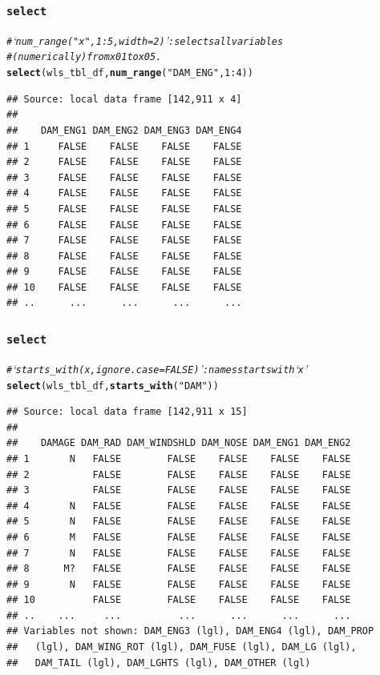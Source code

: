 \documentclass{beamer}\usepackage[]{graphicx}\usepackage[]{color}
\makeatletter
\newcommand{\hlnum}[1]{\textcolor[rgb]{0.686,0.059,0.569}{#1}}%
\newcommand{\hlstr}[1]{\textcolor[rgb]{0.192,0.494,0.8}{#1}}%
\newcommand{\hlcom}[1]{\textcolor[rgb]{0.678,0.584,0.686}{\textit{#1}}}%
\newcommand{\hlopt}[1]{\textcolor[rgb]{0,0,0}{#1}}%
\newcommand{\hlstd}[1]{\textcolor[rgb]{0.345,0.345,0.345}{#1}}%
\newcommand{\hlkwd}[1]{\textcolor[rgb]{0.737,0.353,0.396}{\textbf{#1}}}%
\newenvironment{kframe}{%
 \def\at@end@of@kframe{}%
 \ifinner\ifhmode%
  \def\at@end@of@kframe{\end{minipage}}%
  \begin{minipage}{\columnwidth}%
 \fi\fi%
 \def\FrameCommand##1{\hskip\@totalleftmargin \hskip-\fboxsep
 \colorbox{shadecolor}{##1}\hskip-\fboxsep
     \hskip-\linewidth \hskip-\@totalleftmargin \hskip\columnwidth}%
 \MakeFramed {\advance\hsize-\width
   \@totalleftmargin\z@ \linewidth\hsize
   \@setminipage}}%
 {\par\unskip\endMakeFramed%
 \at@end@of@kframe}
\newenvironment{knitrout}{}{} %
\makeatother
\begin{document}
\begin{frame}[fragile]
  \frametitle{{\tt select}}
\begin{knitrout}\footnotesize
{}\color{fgcolor}\begin{kframe}
\begin{alltt}
\hlcom{# ‘num_range("x", 1:5, width = 2)’: selects all variables}
\hlcom{# (numerically) from x01 to x05.}
\hlkwd{select}\hlstd{(wls_tbl_df,} \hlkwd{num_range}\hlstd{(}\hlstr{"DAM_ENG"}\hlstd{,} \hlnum{1}\hlopt{:}\hlnum{4}\hlstd{))}
\end{alltt}
\begin{verbatim}
## Source: local data frame [142,911 x 4]
## 
##    DAM_ENG1 DAM_ENG2 DAM_ENG3 DAM_ENG4
## 1     FALSE    FALSE    FALSE    FALSE
## 2     FALSE    FALSE    FALSE    FALSE
## 3     FALSE    FALSE    FALSE    FALSE
## 4     FALSE    FALSE    FALSE    FALSE
## 5     FALSE    FALSE    FALSE    FALSE
## 6     FALSE    FALSE    FALSE    FALSE
## 7     FALSE    FALSE    FALSE    FALSE
## 8     FALSE    FALSE    FALSE    FALSE
## 9     FALSE    FALSE    FALSE    FALSE
## 10    FALSE    FALSE    FALSE    FALSE
## ..      ...      ...      ...      ...
\end{verbatim}
\end{kframe}
\end{knitrout}
\end{frame} 

\begin{frame}[fragile]
  \frametitle{{\tt select}}
\begin{knitrout}\footnotesize
{}\color{fgcolor}\begin{kframe}
\begin{alltt}
\hlcom{# ‘starts_with(x, ignore.case = FALSE)’: names starts with ‘x’}
\hlkwd{select}\hlstd{(wls_tbl_df,} \hlkwd{starts_with}\hlstd{(}\hlstr{"DAM"}\hlstd{))}
\end{alltt}
\begin{verbatim}
## Source: local data frame [142,911 x 15]
## 
##    DAMAGE DAM_RAD DAM_WINDSHLD DAM_NOSE DAM_ENG1 DAM_ENG2
## 1       N   FALSE        FALSE    FALSE    FALSE    FALSE
## 2           FALSE        FALSE    FALSE    FALSE    FALSE
## 3           FALSE        FALSE    FALSE    FALSE    FALSE
## 4       N   FALSE        FALSE    FALSE    FALSE    FALSE
## 5       N   FALSE        FALSE    FALSE    FALSE    FALSE
## 6       M   FALSE        FALSE    FALSE    FALSE    FALSE
## 7       N   FALSE        FALSE    FALSE    FALSE    FALSE
## 8      M?   FALSE        FALSE    FALSE    FALSE    FALSE
## 9       N   FALSE        FALSE    FALSE    FALSE    FALSE
## 10          FALSE        FALSE    FALSE    FALSE    FALSE
## ..    ...     ...          ...      ...      ...      ...
## Variables not shown: DAM_ENG3 (lgl), DAM_ENG4 (lgl), DAM_PROP
##   (lgl), DAM_WING_ROT (lgl), DAM_FUSE (lgl), DAM_LG (lgl),
##   DAM_TAIL (lgl), DAM_LGHTS (lgl), DAM_OTHER (lgl)
\end{verbatim}
\end{kframe}
\end{knitrout}
\end{frame} 
\end{document}
